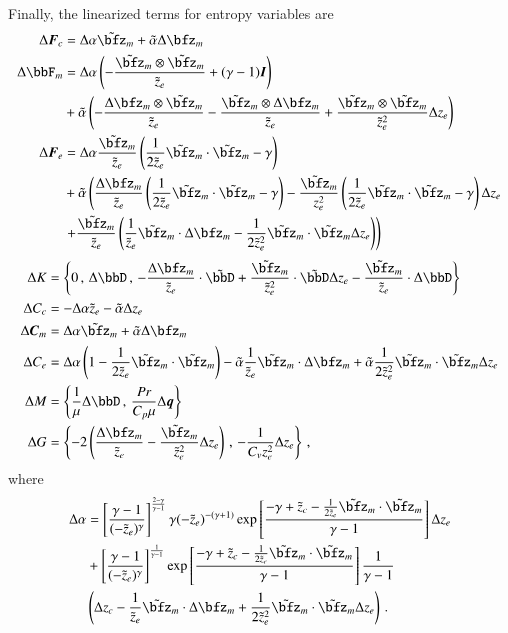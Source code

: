 \documentclass[preprint,12pt]{elsarticle}
\begin{document}
Finally, the linearized terms for entropy variables are
\begin{align*}
\Delta\bfF_c&=\Delta\alpha\tilde\bfz_m+\tilde\alpha\Delta\bfz_m\\
\Delta\bbF_m&=
\Delta\alpha\LRp{-\frac{\tilde\bfz_m\otimes\tilde\bfz_m}{\tilde z_e}+(\gamma-1)\bfI}\\
&+\tilde\alpha\LRp{
-\frac{\Delta\bfz_m\otimes\tilde\bfz_m}{\tilde z_e}
-\frac{\tilde\bfz_m\otimes\Delta\bfz_m}{\tilde z_e}
+\frac{\tilde\bfz_m\otimes\tilde\bfz_m}{\tilde z_e^2}\Delta z_e
}\\
\Delta\bfF_e&=
\Delta\alpha\frac{\tilde\bfz_m}{\tilde z_e}\LRp{\frac{1}{2\tilde z_e}\tilde\bfz_m\cdot\tilde\bfz_m-\gamma}\\
&+\tilde\alpha\LRp{
\frac{\Delta\bfz_m}{\tilde z_e}\LRp{\frac{1}{2\tilde z_e}\tilde\bfz_m\cdot\tilde\bfz_m-\gamma}
-\frac{\tilde\bfz_m}{z_e^2}\LRp{\frac{1}{2\tilde z_e}\tilde\bfz_m\cdot\tilde\bfz_m-\gamma}\Delta z_e\right.\\
&\left.
+\frac{\tilde\bfz_m}{\tilde z_e}\LRp{
\frac{1}{\tilde z_e}\tilde\bfz_m\cdot\Delta\bfz_m
-\frac{1}{2\tilde z_e^2}\tilde\bfz_m\cdot\tilde\bfz_m\Delta z_e
}
}\\
\end{align*}
\begin{align*}
\Delta K&=\LRc{0\,,\,
\Delta\bbD\,,\,
-\frac{\Delta\bfz_m}{\tilde z_e}\cdot\tilde\bbD
+\frac{\tilde\bfz_m}{\tilde z_e^2}\cdot\tilde\bbD\Delta z_e
-\frac{\tilde\bfz_m}{\tilde z_e}\cdot\Delta\bbD}\\
\Delta C_c&=-\Delta\alpha\tilde z_e-\tilde\alpha\Delta z_e\\
\Delta\bfC_m&=\Delta\alpha\tilde\bfz_m+\tilde\alpha\Delta\bfz_m\\
\Delta C_e&=\Delta\alpha\LRp{1-\frac{1}{2\tilde z_e}\tilde\bfz_m\cdot\tilde\bfz_m}
	-\tilde\alpha\frac{1}{\tilde z_e}\tilde\bfz_m\cdot\Delta\bfz_m
	+\tilde\alpha\frac{1}{2\tilde z_e^2}\tilde\bfz_m\cdot\tilde\bfz_m\Delta z_e\\
\Delta M&=\LRc{\frac{1}{\mu}\Delta \bbD\,,\,\frac{Pr}{C_p\mu}\Delta\bfq}\\
\Delta G&=\LRc{-2\LRp{\frac{\Delta\bfz_m}{\tilde z_e}-\frac{\tilde\bfz_m}{\tilde z_e^2}\Delta z_e}\,,\,
-\frac{1}{C_vz_e^2}\Delta z_e}\,,
\end{align*}
where
\begin{align*}
\Delta\alpha&=
\LRs{\frac{\gamma-1}{(-\tilde z_e)^\gamma}}^{\frac{2-\gamma}{\gamma-1}}
\gamma(-\tilde z_e)^{-(\gamma+1)}
\exp\LRs{\frac{-\gamma+\tilde z_c-\frac{1}{2\tilde z_e}\tilde\bfz_m\cdot\tilde\bfz_m}{\gamma-1}}
\Delta z_e\\
&+\LRs{\frac{\gamma-1}{(-\tilde z_e)^\gamma}}^{\frac{1}{\gamma-1}}
\exp\LRs{\frac{-\gamma+\tilde z_c-\frac{1}{2\tilde z_e}\tilde\bfz_m\cdot\tilde\bfz_m}{\gamma-1}}
\frac{1}{\gamma-1}\\
&\LRp{\Delta z_c
-\frac{1}{\tilde z_e}\tilde\bfz_m\cdot\Delta\bfz_m
+\frac{1}{2\tilde z_e^2}\tilde\bfz_m\cdot\tilde\bfz_m\Delta z_e
}\,.
\end{align*}
\end{document}
